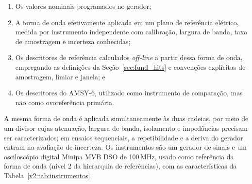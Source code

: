 \begin{enumerate}
	\item Os valores nominais programados no gerador;
	
	\item A forma de onda efetivamente aplicada em um plano de referência elétrico, medida por instrumento independente com calibração, largura de banda, taxa de amostragem e incerteza conhecidas;
	
	\item Os descritores de referência calculados \textit{off-line} a partir dessa forma de onda, empregando as definições da Seção~\ref{sec:fund_hits} e convenções explícitas de amostragem, limiar e janela; e
	
	\item Os descritores do AMSY-6, utilizado como instrumento de comparação, mas não como 
ovo{referência primária}.
\end{enumerate}

A mesma forma de onda é aplicada simultaneamente às duas cadeias, por meio de um divisor cujas atenuação, largura de banda, isolamento e impedâncias precisam ser caracterizados; em ensaios sequenciais, a repetibilidade e a deriva do gerador entram na avaliação de incerteza. Os instrumentos são um gerador de sinais e um osciloscópio digital Minipa MVB DSO de 100\,MHz, usado como referência da forma de onda (nível 2 da hierarquia de referências), com as características da Tabela~\ref{v2:tab:instrumentos}.

